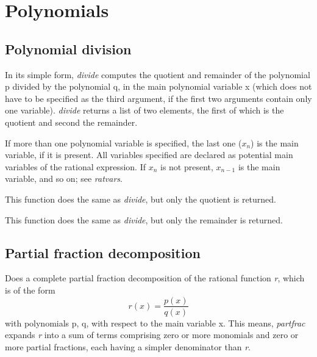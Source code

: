 \documentclass[../Maxima_Workbook.tex]{subfiles}
\begin{document}
	
\chapter{Polynomials}

\section{Polynomial division}

\lz {} \hfill \tcr{[function]}

\lz In its simple form, \emph{divide} computes the quotient and remainder of the polynomial p divided by the polynomial q, in the main polynomial variable x (which does not have to be specified as the third argument, if the first two arguments contain only one variable). \emph{divide} returns a list of two elements, the first of which is the quotient and second the remainder. 

\lz If more than one polynomial variable is specified, the last one ($ x_n $) is the main variable, if it is present. All variables specified are declared as potential main variables of the rational expression. If $ x_n $ is not present, $ x_{n-1} $ is the main variable, and so on; see \emph{ratvars}.

\lzz {} \hfill \tcr{[function]}

\lz This function does the same as \emph{divide}, but only the quotient is returned.

\lzz {} \hfill \tcr{[function]}

\lz This function does the same as \emph{divide}, but only the remainder is returned.

\section{Partial fraction decomposition}

\lz {} \hfill \tcr{[function]}

\lz Does a complete partial fraction decomposition of the rational function \emph{r}, which is of the form
\begin{equation*}
	r(x)=\frac{p(x)}{q(x)}
\end{equation*}
with polynomials p, q, with respect to the main variable x. This means, \emph{partfrac} expands \emph{r} into a sum of terms comprising zero or more monomials and zero or more partial fractions, each having a simpler denominator than \emph{r}.
\end{document}
